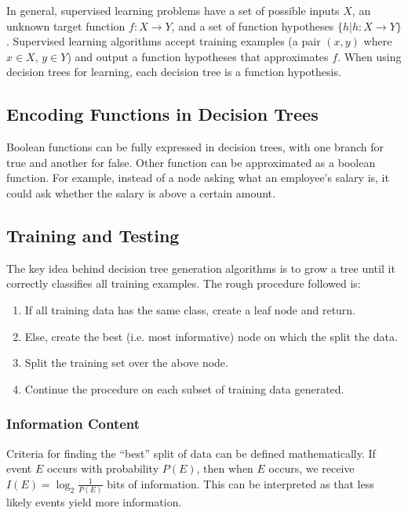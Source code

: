 \documentclass[12pt,titlepage]{article}
\begin{document}
      In general, supervised learning problems have a set of possible inputs $X$, an unknown target function $f: X \rightarrow Y$, and a set of function
      hypotheses $\{h | h: X \rightarrow Y\}$. Supervised learning algorithms accept training examples (a pair $(x, y)$ where $x \in X$, $y \in Y$) and
      output a function hypotheses that approximates $f$. When using decision trees for learning, each decision tree is a function hypothesis.

    \subsection{Encoding Functions in Decision Trees}
      Boolean functions can be fully expressed in decision trees, with one branch for true and another for false. Other function can be approximated as a
      boolean function. For example, instead of a node asking what an employee's salary is, it could ask whether the salary is above a certain amount.

    \subsection{Training and Testing}
      The key idea behind decision tree generation algorithms is to grow a tree until it correctly classifies all training examples. The rough procedure
      followed is:

      \begin{enumerate}
        \item If all training data has the same class, create a leaf node and return.
        \item Else, create the best (i.e. most informative) node on which the split the data.
        \item Split the training set over the above node.
        \item Continue the procedure on each subset of training data generated.
      \end{enumerate}

      \subsubsection{Information Content}
        Criteria for finding the ``best'' split of data can be defined mathematically. If event $E$ occurs with probability $P(E)$, then when $E$ occurs, we
        receive $I(E) = \log_2{\frac{1}{P(E)}}$ bits of information. This can be interpreted as that less likely events yield more information.
\end{document}
